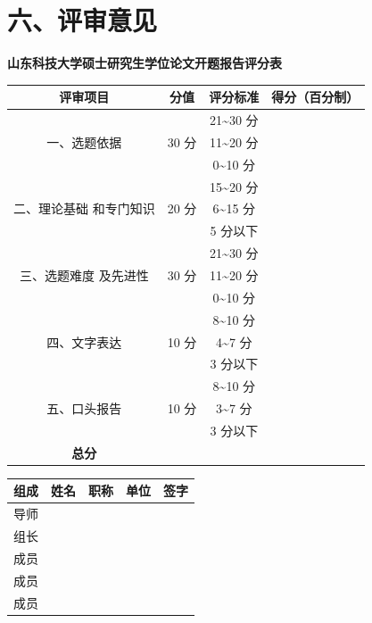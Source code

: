 \documentclass[UTF8,a4paper,zihao=-4,fontset=windows]{ctexart}
\begin{document}
\section{六、评审意见}
\begin{center}{\bfseries 山东科技大学硕士研究生学位论文开题报告评分表}\end{center}
\begin{center}
\renewcommand{\arraystretch}{1.5}
\begin{tabular}{|c|c|c|c|}
\hline
\textbf{评审项目} & \textbf{分值} & \textbf{评分标准} & \textbf{得分（百分制）} \\
\hline
\multirow[t]{3}{*}{一、选题依据} & \multirow[t]{3}{*}{30 分} & 21\textasciitilde{}30 分 & \\ \hline
 & & 11\textasciitilde{}20 分 & \\ \hline
 & & 0\textasciitilde{}10 分 & \\ \hline
\multirow[t]{3}{*}{二、理论基础
和专门知识} & \multirow[t]{3}{*}{20 分} & 15\textasciitilde{}20 分 & \\ \hline
 & & 6\textasciitilde{}15 分 & \\ \hline
 & & 5 分以下 & \\ \hline
\multirow[t]{3}{*}{三、选题难度
及先进性} & \multirow[t]{3}{*}{30 分} & 21\textasciitilde{}30 分 & \\ \hline
 & & 11\textasciitilde{}20 分 & \\ \hline
 & & 0\textasciitilde{}10 分 & \\ \hline
\multirow[t]{3}{*}{四、文字表达} & \multirow[t]{3}{*}{10 分} & 8\textasciitilde{}10 分 & \\ \hline
 & & 4\textasciitilde{}7 分 & \\ \hline
 & & 3 分以下 & \\ \hline
\multirow[t]{3}{*}{五、口头报告} & \multirow[t]{3}{*}{10 分} & 8\textasciitilde{}10 分 & \\ \hline
 & & 3\textasciitilde{}7 分 & \\ \hline
 & & 3 分以下 & \\ \hline
\textbf{总分} & & & \\ \hline
\end{tabular}
\end{center}
\vspace{0.4\baselineskip}
\vspace{0.6\baselineskip}\par
\renewcommand{\arraystretch}{2.0}
\noindent\begin{tabularx}{\textwidth}{|>{\centering\arraybackslash}p{1.6cm}|>{\centering\arraybackslash}p{2.4cm}|>{\centering\arraybackslash}p{2.4cm}|X|>{\centering\arraybackslash}p{2.6cm}|}
\hline
\textbf{组成} & \textbf{姓名} & \textbf{职称} & \textbf{单位} & \textbf{签字} \\ \hline
导师 &  &  &  &  \\ \hline
组长 &  &  &  &  \\ \hline
成员 &  &  &  &  \\ \hline
成员 &  &  &  &  \\ \hline
成员 &  &  &  &  \\ \hline
\end{tabularx}
\end{document}
